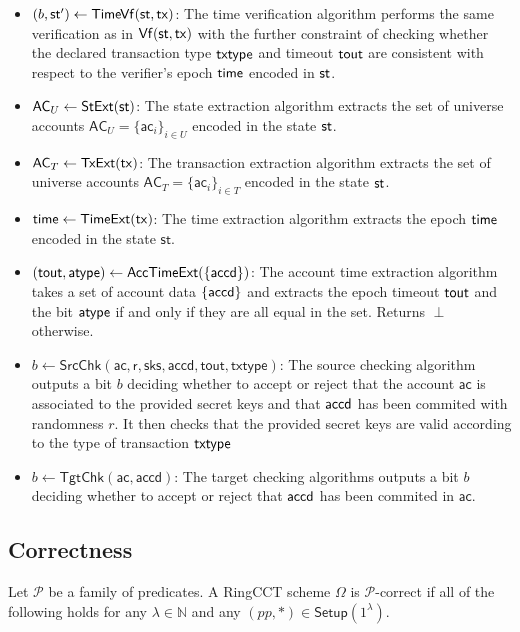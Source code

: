 \begin{itemize}
\item $(b,\mathsf{st}') \gets \mathsf{TimeVf}(\st,\tx)$: The time verification algorithm performs the same verification as in $\mathsf{Vf}(\st, \tx)$ with the further constraint of checking whether the declared transaction type $\mathsf{txtype}$ and timeout $\mathsf{tout}$ are consistent with respect to the verifier's epoch $\mathsf{time}$ encoded in $\st$.
    \item $\mathsf{AC}_U \gets \mathsf{StExt}(\st)$: The state extraction algorithm
    extracts the set of universe accounts $\mathsf{AC}_U = \{\mathsf{ac}_i\}_{i \in U}$ encoded in the state $\st$.
    \item $\mathsf{AC}_T \gets \mathsf{TxExt}(\mathsf{tx})$: The transaction extraction algorithm
    extracts the set of universe accounts $\mathsf{AC}_T = \{\mathsf{ac}_i\}_{i \in T}$ encoded in the state $\st$.
    \item $\mathsf{time} \gets \mathsf{TimeExt}(\mathsf{tx})$: The time extraction algorithm
    extracts the epoch $\mathsf{time}$ encoded in the state $\mathsf{st}$.
\item $(\mathsf{tout}, \mathsf{atype}) \gets \mathsf{AccTimeExt}(\{\mathsf{accd}\})$: The account time extraction algorithm takes a set of account data $\{\mathsf{accd}\}$ and extracts the epoch timeout $\mathsf{tout}$ and the bit $\mathsf{atype}$ if and only if they are all equal in the set. Returns $\perp$ otherwise.
    \item $b \gets \mathsf{SrcChk}(\mathsf{ac,r,sks,accd,tout,txtype})$: The source checking algorithm outputs a bit $b$ deciding whether to accept or reject that the account $\mathsf{ac}$ is associated to the provided secret keys and that $\mathsf{accd}$ has been commited with randomness $r$. It then checks that the provided secret keys are valid according to the type of transaction $\mathsf{txtype}$
    \item $b \gets \mathsf{TgtChk}(\mathsf{ac,accd})$: The target checking algorithms outputs a bit $b$ deciding whether to accept or reject that $\mathsf{accd}$ has been commited in $\mathsf{ac}$. 
\end{itemize}

\subsection{Correctness}
\begin{definition}[Correctness] Let $\mathcal{P}$ be a family of predicates. A RingCCT scheme $\Omega$ is $\mathcal{P}$-correct if all of the following holds for any $\lambda \in \mathbb{N}$ and any $(pp, *) \in \mathsf{Setup}(1^\lambda)$.
\end{definition}

